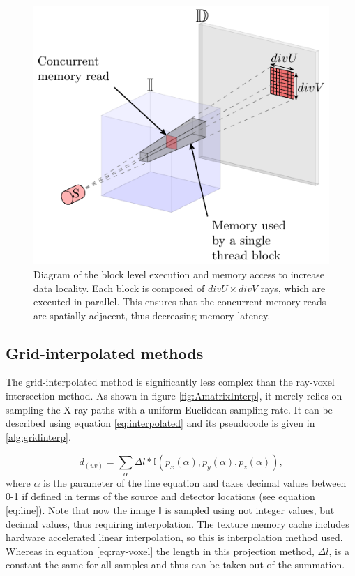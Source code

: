 \begin{figure}
\begin{center}

\includegraphics{GPUmethods/threadblocks-figure0.pdf} 
\end{center}

\caption[Diagram of trheadblock optimized kernel execution]{\label{fig:block} Diagram of the block level execution and memory access to increase data locality. Each block is composed of $divU\times divV$ rays, which are executed in parallel. This ensures that the concurrent memory reads are spatially adjacent, thus decreasing memory latency.} 
\end{figure}




\subsection{Grid-interpolated methods}

The grid-interpolated method is significantly less complex than the ray-voxel intersection method. As shown in figure \ref{fig:AmatrixInterp}, it merely relies on sampling the X-ray paths with a uniform Euclidean sampling rate. It can be described using equation \ref{eq:interpolated} and its pseudocode is given in \ref{alg:gridinterp}.

\begin{equation}
d_{(uv)}= \sum_{\alpha}\Delta l*\mathbb{I}(p_x(\alpha),p_y(\alpha),p_z(\alpha)),
\label{eq:interpolated}
\end{equation}
where $\alpha$ is the parameter of the line equation and takes decimal values between 0-1 if defined in terms of the source and detector locations (see equation \ref{eq:line}). Note that now the image $\mathbb{I}$ is sampled using not integer values, but decimal values, thus requiring interpolation. The texture memory cache includes hardware accelerated linear interpolation, so this is interpolation method used. Whereas in equation \ref{eq:ray-voxel} the length in this projection method, $\Delta l$, is a constant the same for all samples and thus can be taken out of the summation.

